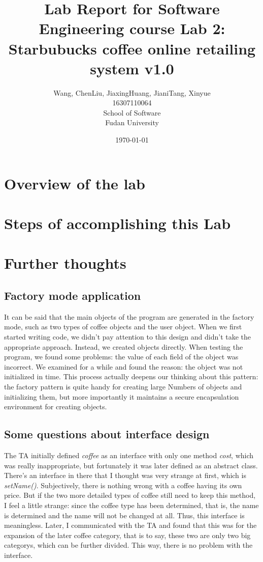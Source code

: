 \documentclass[a4paper]{report}
\title{Lab Report for Software Engineering course \newline
 Lab 2: Starbubucks coffee online retailing system v1.0}
\author{Wang, Chen\qquad Liu, Jiaxing\qquad Huang, Jiani\qquad Tang, Xinyue \\
16307110064\qquad17302010049\qquad 17302010063\qquad 16307110476 \\
School of Software\\
Fudan University
 }
\date{\today}
\begin{document}
\maketitle

\tableofcontents

\chapter{Overview of the lab}



\chapter{Steps of accomplishing this Lab}



\chapter{Further thoughts}
\section{Factory mode application}
It can be said that the main objects of the program are generated in the factory mode, such as two types of coffee objects and the user object.
When we first started writing code, we didn't pay attention to this design and didn't take the appropriate approach. Instead, we created objects directly.
When testing the program, we found some problems: the value of each field of the object was incorrect. 
We examined for a while and found the reason: the object was not initialized in time.
This process actually deepens our thinking about this pattern: the factory pattern is quite handy for creating large Numbers of objects and initializing them, but more importantly it maintains a secure encapsulation environment for creating objects.
\section{Some questions about interface design}
The TA initially defined \emph{coffee} as an interface with only one method \emph{cost}, which was really inappropriate, but fortunately it was later defined as an abstract class.
There's an interface in there that I thought was very strange at first, which is \emph{setName()}.
Subjectively, there is nothing wrong with a coffee having its own price.
But if the two more detailed types of coffee still need to keep this method, I feel a little strange: since the coffee type has been determined, that is, the name is determined and the name will not be changed at all. Thus, this interface is meaningless.
Later, I communicated with the TA and found that this was for the expansion of the later coffee category, that is to say, these two are only two big categorys, which can be further divided.
This way, there is no problem with the interface.
\end{document}
